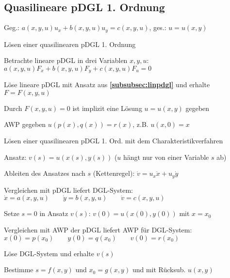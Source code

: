 \documentclass[german,color,5pt]{latex4ei/latex4ei_fs}
\begin{document}
\begin{sectionbox}
	\subsection{Quasilineare pDGL 1. Ordnung}
	Geg.: $a(x,y,u)u_x+b(x,y,u)u_y=c(x,y,u)$, ges.: $u=u(x,y)$ \\ \vspace{-1em}
	\begin{cookbox}{Lösen einer quasilinearen pDGL 1. Ordnung}
		\item Betrachte lineare pDGL in drei Variablen $x,y,u$:
		\\$a(x,y,u)F_{x}+b(x,y,u)F_{y}+c(x,y,u)F_{u}=0$
		\item Löse lineare pDGL mit Ansatz aus {\bf\ref{subsubsec:linpdgl}} und erhalte	$F=F(x,y,u) $
		\item Durch $F(x,y,u)=0 $ ist implizit eine Lösung $u=u(x,y) $ gegeben
	\end{cookbox}
	AWP gegeben $u(p(x),q(x))=r(x)$, z.B. $u(x,0)=x$
	\begin{cookbox}{Lösen einer quasilinearen pDGL 1. Ord. mit dem Charakteristikverfahren}
		\item Ansatz: $v(s)=u(x(s),y(s))$ \qquad ($u$ hängt nur von einer Variable $s$ ab)
		\item Ableiten des Ansatzes nach $s$ (Kettenregel): \quad $\dot v = u_x \dot x + u_y \dot y$
		\item Vergleichen mit pDGL liefert DGL-System:\\ 
		 $\dot x =a(x,y,u) \qquad \dot y=b(x,y,u) \qquad \dot v=c(x,y,u)$
		\item Setze $s=0$ in Ansatz $v(s)$: \quad $v(0)=u(x(0),y(0))$ mit $x=x_0$
		\item Vergleichen mit AWP der pDGL liefert AWP für DGL-System: \\
		$x(0)=p(x_0) \qquad y(0)=q(x_0) \qquad v(0)=r(x_0)$ 
		\item Löse DGL-System und erhalte $v(s)$
		\item Bestimme $s=f(x,y)$ und $x_0=g(x,y)$ und mit Rücksub. $u(x,y)$
	\end{cookbox}
\end{sectionbox}


\end{document}
